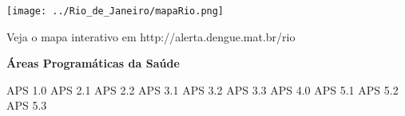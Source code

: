 \documentclass[10pt]{article} %
\begin{document}
 \begin{minipage}[t]{0.6\linewidth} %
\hypertarget{mun}{} %


\texttt{[image: ../Rio\_de\_Janeiro/mapaRio.png]}

\small{Veja o mapa interativo em http://alerta.dengue.mat.br/rio}

\vspace{2cm}

\begin{center}

\end{center}

\BackToContents %
\end{minipage}
\begin{minipage}[t]{.26\linewidth} 
\begin{mdframed}[style=sidebar,frametitle={}] 


\textbf{Áreas Programáticas da Saúde} 

\begin{itemize}\gsquare APS  1.0 
\gsquare APS  2.1 
\ysquare APS  2.2 
\ysquare APS  3.1 
\gsquare APS  3.2 
\gsquare APS  3.3 
\gsquare APS  4.0 
\gsquare APS  5.1 
\gsquare APS  5.2 
\gsquare APS  5.3 \end{itemize}
\end{mdframed} 
\end{minipage}
\newpage

\end{document}
